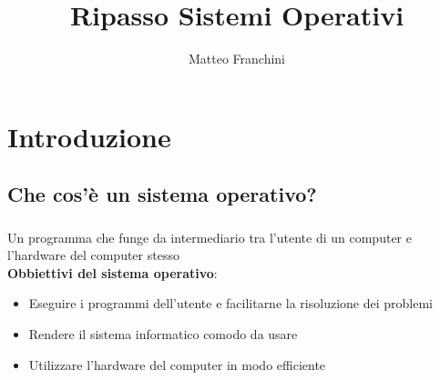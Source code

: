 \documentclass{beamer}
\author{Matteo Franchini}
\title{Ripasso Sistemi Operativi}
\newenvironment{mainframe}{
	\begin{frame}
		\frametitle{\insertsubsection}
		\framesubtitle{\insertsection}
	}{
	\end{frame}
}
\begin{document}
	\begin{frame}
		\titlepage
	\end{frame}
	
	\begin{frame}
		\begin{multicols}{2}
			\tableofcontents[hideallsubsections]
		\end{multicols}
	\end{frame}
	
\section{Introduzione}
\subsection{Che cos'è un sistema operativo?}
\begin{mainframe}
Un programma che funge da intermediario tra l'utente di un computer e l'hardware del computer stesso\\
{\Large \textbf{Obbiettivi del sistema operativo}}:
\begin{itemize}
	\item Eseguire i programmi dell'utente e facilitarne la risoluzione dei problemi
	\item Rendere il sistema informatico comodo da usare
	\item Utilizzare l'hardware del computer in modo efficiente
\end{itemize}
\end{mainframe}
\end{document}
